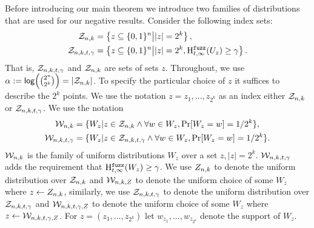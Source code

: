 
\label{sec:family}
Before introducing our main theorem we introduce two families of distributions that are used for our negative results.  Consider the following index sets:
\begin{align*}
\mathcal{Z}_{n,k} &=\left\{z \subseteq \{0, 1\}^n\middle|  |z| = 2^k\right\},\\
\mathcal{Z}_{n,k,t,\gamma} &= \left\{z \subseteq \{0, 1\}^n\middle| |z| = 2^k,\mathrm{H}^{\mathtt{fuzz}}_{t,\infty}(U_z) \ge \gamma\right\}.
\end{align*}
That is, $\mathcal{Z}_{n,k,t,\gamma}$ and $\mathcal{Z}_{n,k}$ are sets of sets $z$.  Throughout, we use $\alpha:= \mathsf{log}\!\left({2^n\choose 2^k}\right) = |\mathcal{Z}_{n,k}|$. To specify the particular choice of $z$ it suffices to describe the $2^k$ points.  We use the notation $z = z_{1},..., z_{2^k}$ as an index either $\mathcal{Z}_{n,k}$ or $\mathcal{Z}_{n,k,t,\gamma}$.
We use the notation 
\begin{align*}
\mathcal{W}_{n,k} &=\{W_z | z \in \mathcal{Z}_{n,k}  \wedge \forall w \in W_z, \Pr[W_z=w]=1/2^k\},\\
\mathcal{W}_{n,k,t,\gamma} &= \{W_z | z\in \mathcal{Z}_{n,k,t,\gamma} \wedge \forall w \in W_z, \Pr[W_z=w]=1/2^k\}.
\end{align*}
$\mathcal{W}_{n,k}$ is the family of uniform distributions $W_z$ over a set $z, |z|=2^k$.
$\mathcal{W}_{n,k,t,\gamma}$ adds the requirement that $\mathrm{H}^{\mathtt{fuzz}}_{t,\infty}(W_z)\ge\gamma$. We use $Z_{n,k}$ to denote the uniform distribution over $\mathcal{Z}_{n,k}$ and $\mathcal{W}_{n,k, Z}$ to denote the uniform choice of some $W_z$ where $z\leftarrow Z_{n,k}$, similarly, we use $\mathcal{Z}_{n,k,t,\gamma}$ to denote the uniform distribution over $\mathcal{Z}_{n,k,t,\gamma}$ and $\mathcal{W}_{n,k,t,\gamma, Z}$ to denote the uniform choice of some $W_z$ where $z\leftarrow \mathcal{W}_{n,k,t,\gamma, Z}$. For $z=(z_1,..., z_{2^k})$ let $w_{z_1},..., w_{z_{2^k}}$ denote the support of $W_z$.